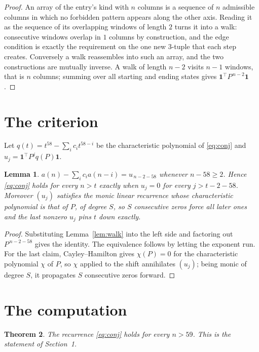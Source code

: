 \documentclass[11pt,a4paper]{article}
\theoremstyle{plain}
\newtheorem{theorem}{Theorem}
\newtheorem{lemma}[theorem]{Lemma}
\theoremstyle{definition}
\begin{document}
\begin{proof}
An array of the entry's kind with $n$ columns is a sequence of $n$ admissible columns in
which no forbidden pattern appears along the other axis. Reading it as the sequence of its
overlapping windows of length $2$ turns it into a walk: consecutive windows overlap in
$1$ columns by construction, and the edge condition is exactly the requirement on the one
new $3$-tuple that each step creates. Conversely a walk reassembles into such an array,
and the two constructions are mutually inverse. A walk of length $n-2$ visits $n-1$
windows, that is $n$ columns; summing over all starting and ending states gives
$\mathbf{1}^{\!\top}P^{\,n-2}\mathbf{1}$.
\end{proof}

\section{The criterion}

Let $q(t)=t^{58}-\sum_i c_i t^{58-i}$ be the characteristic polynomial of
\eqref{eq:conj} and $u_j=\mathbf{1}^{\!\top}P^{j}q(P)\mathbf{1}$.

\begin{lemma}\label{lem:crit}
$a(n)-\sum_i c_i a(n-i)=u_{\,n-2-58}$ whenever $n-58\ge2$. Hence
\eqref{eq:conj} holds for every $n>t$ exactly when $u_j=0$ for every
$j>t-2-58$. Moreover $(u_j)$ satisfies the monic linear recurrence whose
characteristic polynomial is that of $P$, of degree $S$, so $S$ consecutive zeros force all
later ones and the last nonzero $u_j$ pins $t$ down exactly.
\end{lemma}

\begin{proof}
Substituting Lemma~\ref{lem:walk} into the left side and factoring out
$P^{\,n-2-58}$ gives the identity. The equivalence follows by letting the exponent
run. For the last claim, Cayley--Hamilton gives $\chi(P)=0$ for the characteristic
polynomial $\chi$ of $P$, so $\chi$ applied to the shift annihilates $(u_j)$; being monic of
degree $S$, it propagates $S$ consecutive zeros forward.
\end{proof}

\section{The computation}

\begin{theorem}
The recurrence \eqref{eq:conj} holds for every $n>59$. This is the statement of
Section~1.
\end{theorem}
\end{document}
